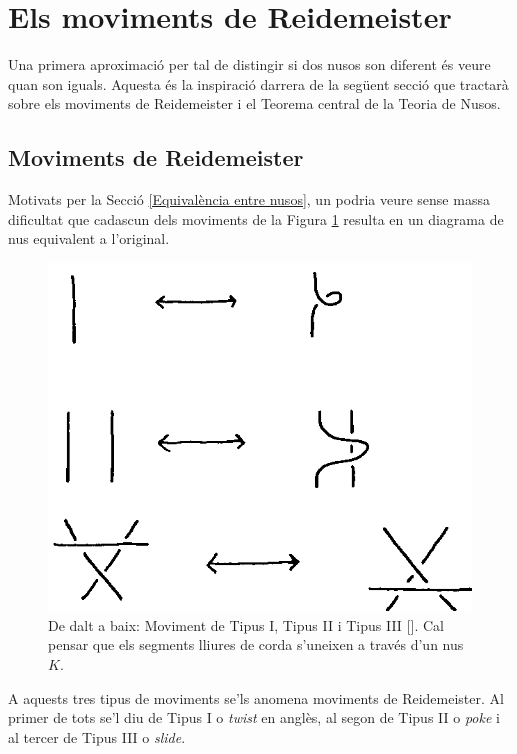 
\section{Els moviments de Reidemeister}\label{sec:Reidermeister}
Una primera aproximació per tal de distingir si dos nusos son diferent és veure quan son iguals. Aquesta és la inspiració darrera de la següent secció que tractarà sobre els moviments de Reidemeister i el Teorema central de la Teoria de Nusos.

\subsection{Moviments de Reidemeister}\label{subsec:Moviments de Reidemeister}
Motivats per la Secció \ref{Equivalència entre nusos}, un podria veure sense massa dificultat que cadascun dels moviments de la Figura \ref{fig:Moviments de Reidemeister} resulta en un diagrama de nus equivalent a l'original.\\

\begin{figure}[h]
	\centering
	\includegraphics[width=0.9\linewidth]{img/MovimentsdeReidemeister.png}
	\caption{De dalt a baix: Moviment de Tipus I, Tipus II i Tipus III  [\cite{SobreelsmovdeReide}]. Cal pensar que els segments lliures de corda s'uneixen a través d'un nus $K$.}\label{fig:Moviments de Reidemeister}
\end{figure}

A aquests tres tipus de moviments se'ls anomena moviments de Reidemeister. Al primer de tots se'l diu de Tipus I o \textit{twist} en anglès, al segon de Tipus II o \textit{poke} i al tercer de Tipus III o \textit{slide}.\\

